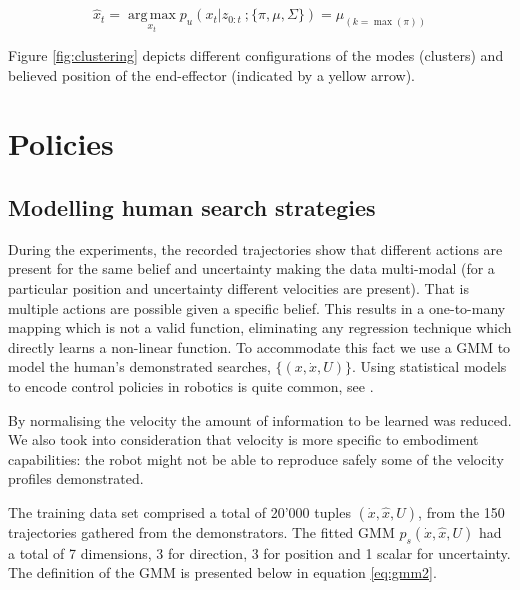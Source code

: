 \begin{equation}
 \hat{x}_t = \operatorname*{arg\,max}_{x_t} p_u(x_{t}|z_{0:t}\: ;\{\pi,\mu,\Sigma\}) = \mu_{(k = \max(\pi))}
\end{equation}

Figure \ref{fig:clustering} depicts different configurations of the modes (clusters) and believed position of the end-effector (indicated by a yellow arrow).  





\section{Policies}\label{chap3:policies}

\subsection{Modelling human search strategies}\label{chap3:GMM_policy}

During the experiments, the recorded trajectories show that different actions are present for the same belief and uncertainty making the data multi-modal
(for a particular position and uncertainty different velocities are present). That is multiple actions are possible given a specific belief. 
This results in a one-to-many mapping which is not a valid function, eliminating any regression technique which directly learns a non-linear function. 
To accommodate this fact we use a GMM to model the human's demonstrated searches, $\{(x,\dot{x},U)\}$. 
Using statistical models to encode control policies in robotics is quite common, see \cite{BillardCDS08}. 

By normalising the velocity the amount of information to be learned was reduced. We also took into consideration that velocity is more 
specific to embodiment capabilities: the robot might not be able to reproduce safely some of the velocity profiles demonstrated. 

The training data set comprised a total of 20'000 tuples $(\dot{x},\hat{x},U)$, from the 150 trajectories gathered from the demonstrators. 
The fitted GMM $p_s(\dot{x},\hat{x},U)$ had a total of 7 dimensions, 3 for direction, 3 for position and 1 scalar for uncertainty. 
The definition of the GMM is presented below in equation \ref{eq:gmm2}.

